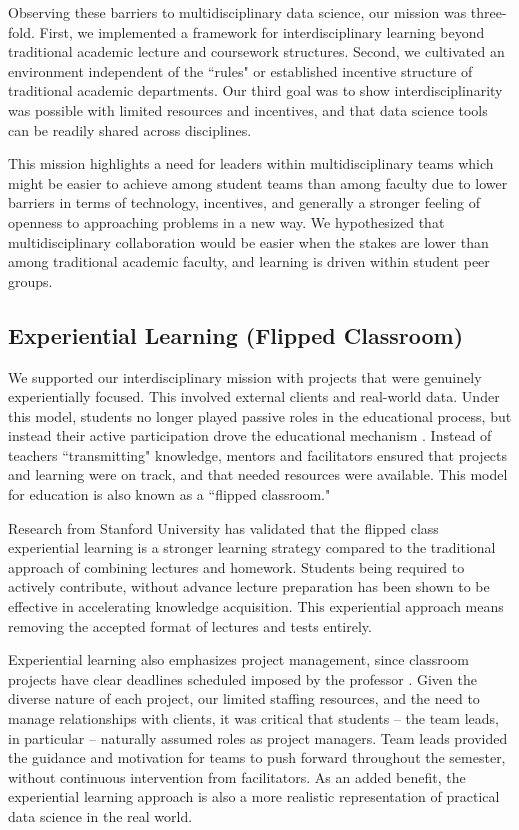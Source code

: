 \documentclass[12pt]{article}
\begin{document}
Observing these barriers to multidisciplinary data science, our mission was three-fold. First, we implemented a framework for interdisciplinary learning beyond traditional academic lecture and coursework structures. Second, we cultivated an environment independent of the ``rules" or established incentive structure of traditional academic departments. Our third goal was to show interdisciplinarity was possible with limited resources and incentives, and that data science tools can be readily shared across disciplines. 

This mission highlights a need for leaders within multidisciplinary teams which might be easier to achieve among student teams than among faculty due to lower barriers in terms of technology, incentives, and generally a stronger feeling of openness to approaching problems in a new way. We hypothesized that multidisciplinary collaboration would be easier when the stakes are lower than among traditional academic faculty, and learning is driven within student peer groups.

\subsection{Experiential Learning (Flipped Classroom)}

We supported our interdisciplinary mission with projects that were genuinely experientially focused.  This involved external clients and real-world data. Under this model, students no longer played passive roles in the educational process, but instead their active participation drove the educational mechanism \citep{beard2010experiential}. Instead of teachers ``transmitting" knowledge, mentors and facilitators ensured that projects and learning were on track, and that needed resources were available. This model for education is also known as a ``flipped classroom."

Research from Stanford University \citep{plotnikoff_classes_2013} has validated that the flipped class experiential learning is a stronger learning strategy compared to the traditional approach of combining lectures and homework. Students being required to actively contribute, without advance lecture preparation has been shown to be effective in accelerating knowledge acquisition. This experiential approach means removing the accepted format of lectures and tests entirely. 

Experiential learning also emphasizes project management, since classroom projects have clear deadlines scheduled imposed by the professor \citep{mok2014teaching}. Given the diverse nature of each project, our limited staffing resources, and the need to manage relationships with clients, it was critical that students -- the team leads, in particular -- naturally assumed roles as project managers.  Team leads provided the guidance and motivation for teams to push forward throughout the semester, without continuous intervention from facilitators. As an added benefit, the experiential learning approach is also a more realistic representation of practical data science in the real world.
\end{document}
